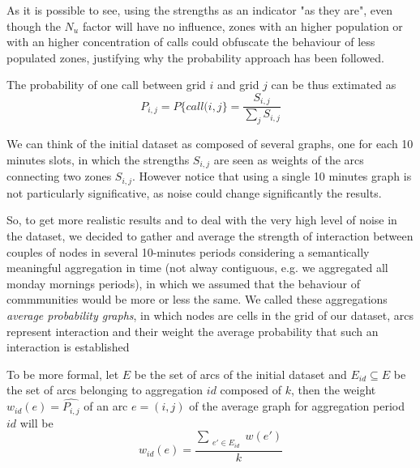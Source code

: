 As it is possible to see, using the strengths as an indicator "as they are", even though the $N_{u}$ factor will have no influence, 
zones with an higher population or with an higher concentration of calls could obfuscate the behaviour of less populated zones, justifying 
why the probability approach has been followed.

The probability of one call between grid $i$ and grid $j$ can be thus extimated as
$$
P_{i,j} = P\{call(i,j\} = \frac{S_{i,j}}{\sum_{j}{}{S_{i,j}}}
$$

We can think of the initial dataset as composed of several graphs, one for each 10 minutes slots, in which the strengths $S_{i,j}$ are seen as weights of the arcs connecting two zones $S_{i,j}$. 
However notice that using a single 10 minutes graph is not particularly significative, as noise could change significantly the results.

So, to get more realistic results and to deal with the very high level of noise in the dataset,
we decided to gather and average the strength of interaction between couples of nodes in several 10-minutes periods
considering a semantically meaningful aggregation in time (not alway contiguous, e.g. we aggregated all monday
mornings periods), in which we assumed that the behaviour of commmunities would be more or less the same.
\label{AVGPG}
We called these aggregations \emph{average probability graphs}, in which nodes are cells in the grid of our dataset, arcs represent interaction and their weight the average probability that such an interaction is established

To be more formal, let $E$ be the set of arcs of the initial dataset and $E_{id} \subseteq E$ be the set of arcs belonging to aggregation $id$ composed of $k$, then the weight $w_{id}(e)=\widehat{P_{i,j}}$ of an arc $e=(i,j)$ of the average graph for aggregation period $id$ will be 
$$
w_{id}(e) = \frac{\sum_{\substack{e' \in E_{id}}} w(e')}{k}
$$

